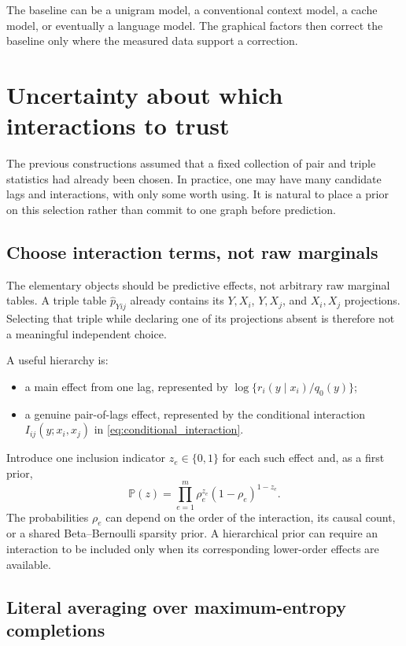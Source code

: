 \documentclass[11pt]{article}
\newcommand{\Pp}{\mathbb P}
\newcommand{\1}{\mathbf 1}
\newcommand{\hatp}{\widehat p}
\begin{document}
The baseline can be a unigram model, a conventional context model, a cache
model, or eventually a language model.  The graphical factors then correct the
baseline only where the measured data support a correction.

\section{Uncertainty about which interactions to trust}

The previous constructions assumed that a fixed collection of pair and triple
statistics had already been chosen.  In practice, one may have many candidate
lags and interactions, with only some worth using.  It is natural to place a
prior on this selection rather than commit to one graph before prediction.

\subsection{Choose interaction terms, not raw marginals}

The elementary objects should be predictive effects, not arbitrary raw
marginal tables.  A triple table \(\hatp_{Yij}\) already contains its
\(Y,X_i\), \(Y,X_j\), and \(X_i,X_j\) projections.  Selecting that triple
while declaring one of its projections absent is therefore not a meaningful
independent choice.

A useful hierarchy is:
\begin{itemize}
  \item a main effect from one lag, represented by
  \(\log\{r_i(y\mid x_i)/q_0(y)\}\);
  \item a genuine pair-of-lags effect, represented by the conditional
  interaction \(I_{ij}(y;x_i,x_j)\) in
  \eqref{eq:conditional_interaction}.
\end{itemize}
Introduce one inclusion indicator \(z_e\in\{0,1\}\) for each such effect and,
as a first prior,
\[
  \Pp(z)
  =
  \prod_{e=1}^m\rho_e^{z_e}(1-\rho_e)^{1-z_e}.
  \label{eq:independent_structure_prior}
\]
The probabilities \(\rho_e\) can depend on the order of the interaction, its
causal count, or a shared Beta--Bernoulli sparsity prior.  A hierarchical prior
can require an interaction to be included only when its corresponding
lower-order effects are available.

\subsection{Literal averaging over maximum-entropy completions}
\end{document}
